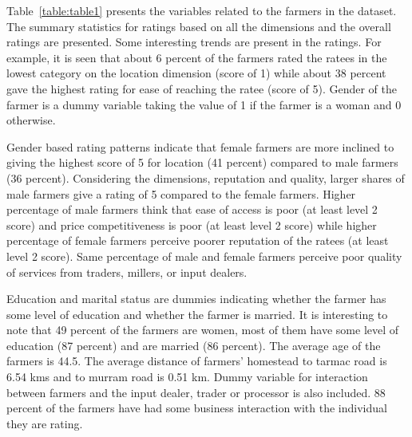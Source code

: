 \documentclass[12pt,english]{article}\usepackage[]{graphicx}\usepackage[]{color}
\begin{document}
Table~\ref{table:table1} presents the variables related to the farmers
in the dataset. The summary statistics for ratings based on all the
dimensions and the overall ratings are presented. Some interesting
trends are present in the ratings. For example, it is seen that about
6
percent of the farmers rated the ratees in the lowest category on
the location dimension (score of 1) while about 38
percent gave the highest rating for ease of reaching the ratee (score
of 5). Gender of the farmer is a dummy variable taking the value of
1 if the farmer is a woman and 0 otherwise. 

Gender based rating patterns indicate that female farmers are more
inclined to giving the highest score of 5 for location (41
percent) compared to male farmers (36
percent). Considering the dimensions, reputation and quality, larger
shares of male farmers give a rating of 5 compared to the female farmers.
Higher percentage of male farmers think that ease of access is poor
(at least level 2 score) and price competitiveness is poor (at least
level 2 score) while higher percentage of female farmers perceive
poorer reputation of the ratees (at least level 2 score). Same percentage
of male and female farmers perceive poor quality of services from
traders, millers, or input dealers.

Education and marital status are dummies indicating whether the farmer
has some level of education and whether the farmer is married. It
is interesting to note that 49
percent of the farmers are women, most of them have some level of
education (87
percent) and are married (86
percent). The average age of the farmers is 44.5.
The average distance of farmers' homestead to tarmac road is 6.54
kms and to murram road is 0.51
km. Dummy variable for interaction between farmers and the input dealer,
trader or processor is also included. 88
percent of the farmers have had some business interaction with the
individual they are rating. 
\end{document}
